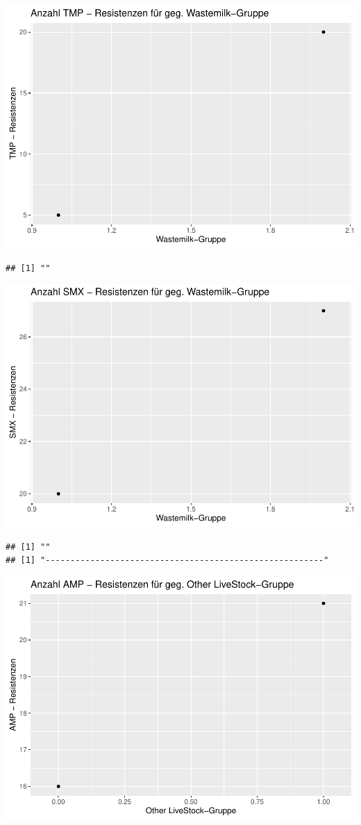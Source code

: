 \documentclass[
]{article}
\begin{document}
\includegraphics{NResistenzen_files/figure-latex/unnamed-chunk-7-9.pdf}

\begin{verbatim}
## [1] ""
\end{verbatim}

\includegraphics{NResistenzen_files/figure-latex/unnamed-chunk-7-10.pdf}

\begin{verbatim}
## [1] ""
## [1] "--------------------------------------------------------"
\end{verbatim}

\includegraphics{NResistenzen_files/figure-latex/unnamed-chunk-7-11.pdf}
\end{document}
